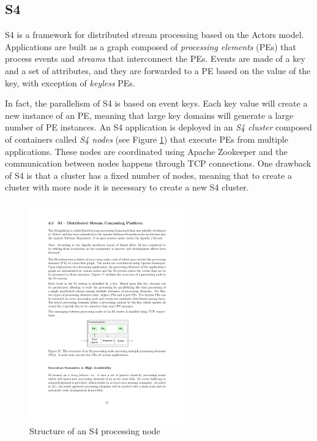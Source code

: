 \documentclass[ppgc,diss,english]{iiufrgs}
\begin{document}
\subsection{S4}

S4 is a framework for distributed stream processing based on the Actors model. Applications are built as a graph composed of \emph{processing elements} (PEs) that process events and \emph{streams} that interconnect the PEs. Events are made of a key and a set of attributes, and they are forwarded to a PE based on the value of the key, with exception of \emph{keyless} PEs.

In fact, the parallelism of S4 is based on event keys. Each key value will create a new instance of an PE, meaning that large key domains will generate a large number of PE instances. An S4 application is deployed in an \emph{S4 cluster} composed of containers called \emph{S4 nodes} (see Figure \ref{fig:s4_structure}) that execute PEs from multiple applications. These nodes are coordinated using Apache Zookeeper and the communication between nodes happens through TCP connections. One drawback of S4 is that a cluster has a fixed number of nodes, meaning that to create a cluster with more node it is necessary to create a new S4 cluster.

\begin{figure}[!ht]
	\centering
	\includegraphics[width=0.6\textwidth]{images/s4/structure.pdf}
	\caption[Structure of an S4 processing node]{Structure of an S4 processing node \cite{bockermann2014survey}}
	\label{fig:s4_structure}
\end{figure}
\end{document}
